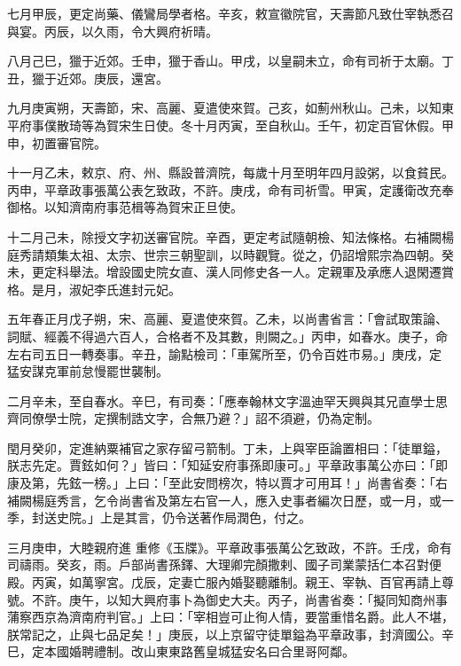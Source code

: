 \begin{pinyinscope}
 七月甲辰，更定尚藥、儀鸞局學者格。辛亥，敕宣徽院官，天壽節凡致仕宰執悉召與宴。丙辰，以久雨，令大興府祈晴。



 八月己巳，獵于近郊。壬申，獵于香山。甲戌，以皇嗣未立，命有司祈于太廟。丁丑，獵于近郊。庚辰，還宮。



 九月庚寅朔，天壽節，宋、高麗、夏遣使來賀。己亥，如薊州秋山。己未，以知東平府事僕散琦等為賀宋生日使。冬十月丙寅，至自秋山。壬午，初定百官休假。甲申，初置審官院。



 十一月乙未，敕京、府、州、縣設普濟院，每歲十月至明年四月設粥，以食貧民。丙申，平章政事張萬公表乞致政，不許。庚戌，命有司祈雪。甲寅，定護衛改充奉
 御格。以知濟南府事范楫等為賀宋正旦使。



 十二月己未，除授文字初送審官院。辛酉，更定考試隨朝檢、知法條格。右補闕楊庭秀請類集太祖、太宗、世宗三朝聖訓，以時觀覽。從之，仍詔增熙宗為四朝。癸未，更定科舉法。增設國史院女直、漢人同修史各一人。定親軍及承應人退閑遷賞格。是月，淑妃李氏進封元妃。



 五年春正月戊子朔，宋、高麗、夏遣使來賀。乙未，以尚書省言：「會試取策論、詞賦、經義不得過六百人，合格者不及其數，則闕之。」丙申，如春水。庚子，命左右司五日一轉奏事。辛丑，諭點檢司：「車駕所至，仍令百姓市易。」庚戌，定
 猛安謀克軍前怠慢罷世襲制。



 二月辛未，至自春水。辛巳，有司奏：「應奉翰林文字溫迪罕天興與其兄直學士思齊同僚學士院，定撰制誥文字，合無乃避？」詔不須避，仍為定制。



 閏月癸卯，定進納粟補官之家存留弓箭制。丁未，上與宰臣論置相曰：「徒單鎰，朕志先定。賈鉉如何？」皆曰：「知延安府事孫即康可。」平章政事萬公亦曰：「即康及第，先鉉一榜。」上曰：「至此安問榜次，特以賈才可用耳！」尚書省奏：「右補闕楊庭秀言，乞令尚書省及第左右官一人，應入史事者編次日歷，或一月，或一季，封送史院。」上是其言，仍令送著作局潤色，付之。



 三月庚申，大睦親府進
 重修《玉牒》。平章政事張萬公乞致政，不許。壬戌，命有司禱雨。癸亥，雨。戶部尚書孫鐸、大理卿完顏撒剌、國子司業蒙括仁本召對便殿。丙寅，如萬寧宮。戊辰，定妻亡服內婚娶聽離制。親王、宰執、百官再請上尊號。不許。庚午，以知大興府事卜為御史大夫。丙子，尚書省奏：「擬同知商州事蒲察西京為濟南府判官。」上曰：「宰相豈可止徇人情，要當重惜名爵。此人不堪，朕常記之，止與七品足矣！」庚辰，以上京留守徒單鎰為平章政事，封濟國公。辛巳，定本國婚聘禮制。改山東東路舊皇城猛安名曰合里哥阿鄰。




\end{pinyinscope}
